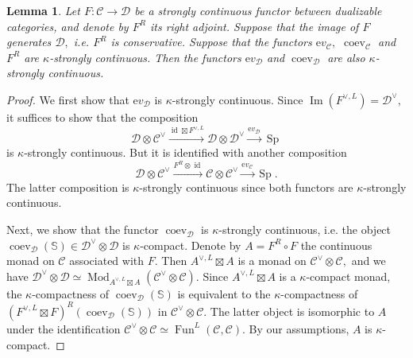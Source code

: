 \documentclass[11pt,leqno]{amsart}
\newtheorem{lemma}[theo]{Lemma}
\numberwithin{equation}{section}
\def\bS{\mathbb{S}}
\newcommand{\xto}{\xrightarrow}
\newcommand{\ev}{\mathrm ev}
\newcommand{\cD}{{\mathcal D}}
\newcommand{\cC}{{\mathcal C}}
\newcommand{\Fun}{\operatorname{Fun}}
\newcommand{\im}{\operatorname{Im}}
\newcommand{\Sp}{\operatorname{Sp}}
\newcommand{\id}{\operatorname{id}}
\newcommand{\coev}{\operatorname{coev}}
\newcommand{\Mod}{\operatorname{Mod}}
\begin{document}
\begin{lemma}\label{lem:suff_cond_for_smallness_of_ev_coev} Let $F:\cC\to\cD$ be a strongly continuous functor between dualizable categories, and denote by $F^R$ its right adjoint. Suppose that the image of $F$ generates $\cD,$ i.e. $F^R$ is conservative. Suppose that the functors $\ev_{\cC},$ $\coev_{\cC}$ and $F^R$ are $\kappa$-strongly continuous. Then the functors $\ev_{\cD}$ and $\coev_{\cD}$ are also $\kappa$-strongly continuous.\end{lemma}

\begin{proof}We first show that $\ev_{\cD}$ is $\kappa$-strongly continuous. Since $\im(F^{\vee,L})=\cD^{\vee},$ it suffices to show that the composition
$$\cD\otimes\cC^{\vee}\xto{\id\boxtimes F^{\vee,L}}\cD\otimes\cD^{\vee}\xto{\ev_{\cD}}\Sp$$ is $\kappa$-strongly continuous. But it is identified with another composition
$$\cD\otimes\cC^{\vee}\xto{F^R\otimes\id}\cC\otimes\cC^{\vee}\xto{\ev_{\cC}}\Sp.$$ The latter composition is $\kappa$-strongly continuous since both functors are $\kappa$-strongly continuous.

Next, we show that the functor $\coev_{\cD}$ is $\kappa$-strongly continuous, i.e. the object $\coev_{\cD}(\bS)\in\cD^{\vee}\otimes\cD$ is $\kappa$-compact. Denote by $A=F^R\circ F$ the continuous monad on $\cC$ associated with $F.$ Then $A^{\vee,L}\boxtimes A$ is a monad on $\cC^{\vee}\otimes\cC,$ and we have $\cD^{\vee}\otimes\cD\simeq\Mod_{A^{\vee,L}\boxtimes A}(\cC^{\vee}\otimes\cC).$ Since $A^{\vee,L}\boxtimes A$ is a $\kappa$-compact monad, the $\kappa$-compactness of $\coev_{\cD}(\bS)$ is equivalent to the $\kappa$-compactness of $(F^{\vee,L}\boxtimes F)^R(\coev_{\cD}(\bS))$ in $\cC^{\vee}\otimes\cC.$ The latter object is isomorphic to $A$ under the identification $\cC^{\vee}\otimes\cC\simeq\Fun^{L}(\cC,\cC).$ By our assumptions, $A$ is $\kappa$-compact.
\end{proof}
\end{document}
